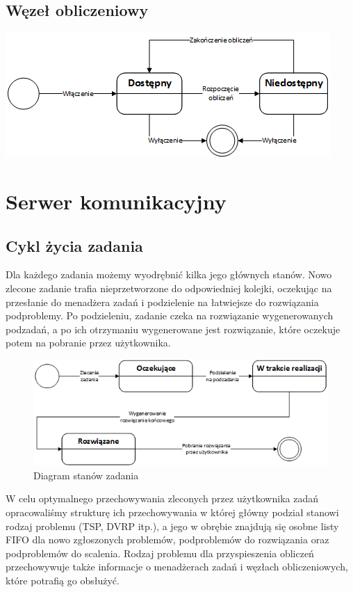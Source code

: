 \documentclass[12pt,a4paper,titlepage]{report}
\begin{document}
		\section{Węzeł obliczeniowy}
		\includegraphics[width=\textwidth]{img/state/ComputationalNode.png}

	\chapter{Serwer komunikacyjny}
	\section {Cykl życia zadania}

	Dla każdego zadania możemy wyodrębnić kilka jego głównych stanów. Nowo zlecone zadanie
	trafia nieprzetworzone do odpowiedniej kolejki, oczekując na przesłanie do menadżera zadań
	i podzielenie na łatwiejsze do rozwiązania podproblemy. Po podzieleniu, zadanie czeka na rozwiązanie
	wygenerowanych podzadań, a po ich otrzymaniu wygenerowane jest rozwiązanie, które oczekuje potem na
	pobranie przez użytkownika.
	
	\begin{figure}[h]
		\centering
		\includegraphics[width=\textwidth]{img/state/Task.png}
		\caption{Diagram stanów zadania}
	\end{figure}
	
	W celu optymalnego przechowywania zleconych przez użytkownika zadań opracowaliśmy
	strukturę ich przechowywania w której główny podział stanowi rodzaj problemu
	(TSP, DVRP itp.), a jego w obrębie znajdują się osobne listy FIFO dla nowo zgłoszonych problemów,
	podproblemów do rozwiązania oraz podproblemów do scalenia. Rodzaj problemu dla przyspieszenia obliczeń
	przechowywuje także informacje o menadżerach zadań i węzłach obliczeniowych, które potrafią
	go obsłużyć. 
	
\end{document}
